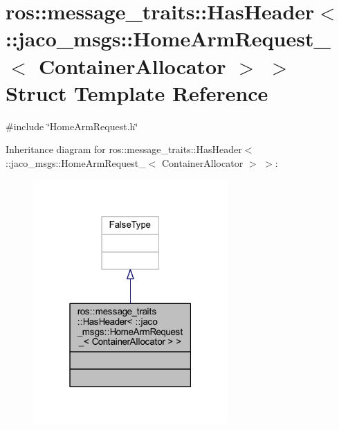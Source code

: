 \hypertarget{structros_1_1message__traits_1_1HasHeader_3_01_1_1jaco__msgs_1_1HomeArmRequest___3_01ContainerAllocator_01_4_01_4}{}\section{ros\+:\+:message\+\_\+traits\+:\+:Has\+Header$<$ \+:\+:jaco\+\_\+msgs\+:\+:Home\+Arm\+Request\+\_\+$<$ Container\+Allocator $>$ $>$ Struct Template Reference}
\label{structros_1_1message__traits_1_1HasHeader_3_01_1_1jaco__msgs_1_1HomeArmRequest___3_01ContainerAllocator_01_4_01_4}


{\ttfamily \#include \char`\"{}Home\+Arm\+Request.\+h\char`\"{}}



Inheritance diagram for ros\+:\+:message\+\_\+traits\+:\+:Has\+Header$<$ \+:\+:jaco\+\_\+msgs\+:\+:Home\+Arm\+Request\+\_\+$<$ Container\+Allocator $>$ $>$\+:
\nopagebreak
\begin{figure}[H]
\begin{center}
\leavevmode
\includegraphics[width=211pt]{d5/de4/structros_1_1message__traits_1_1HasHeader_3_01_1_1jaco__msgs_1_1HomeArmRequest___3_01ContainerAl7f122e3fe6f1717e856475fde1f7b79d}
\end{center}
\end{figure}



